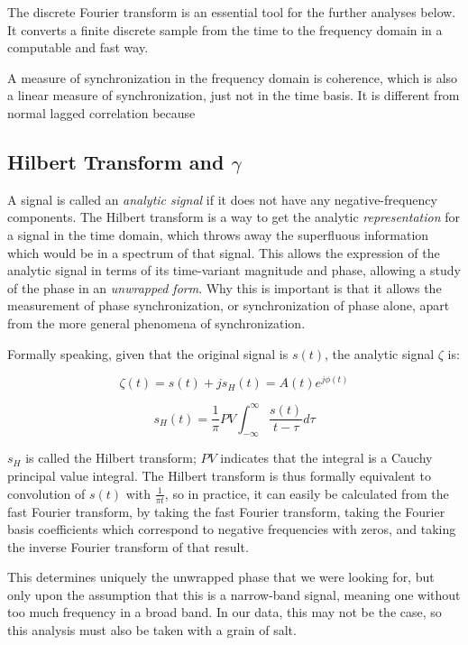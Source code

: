 \documentclass[12pt]{article}
\begin{document}
The discrete Fourier transform is an essential tool for the further analyses below. It converts a finite discrete sample from the time to the frequency domain in a computable and fast way.

A measure of synchronization in the frequency domain is coherence, which is also a linear measure of synchronization, just not in the time basis. It is different from normal lagged correlation because %


\subsection{Hilbert Transform and $\gamma$}

A signal is called an \emph{analytic signal} if it does not have any negative-frequency components. The Hilbert transform is a way to get the analytic \emph{representation} for a signal in the time domain, which throws away the superfluous information which would be in a spectrum of that signal. This allows the expression of the analytic signal in terms of its time-variant magnitude and phase, allowing a study of the phase in an \emph{unwrapped form}\cite{gabor}. Why this is important is that it allows the measurement of phase synchronization, or synchronization of phase alone, apart from the more general phenomena of synchronization.

Formally speaking, given that the original signal is $s(t)$, the analytic signal $\zeta$ is:

$$\zeta(t) = s(t) + js_H(t) = A(t)e^{j\phi(t)}$$

$$s_H(t) = \frac{1}{\pi} PV \int_{-\infty}^{\infty} \frac{s(t)}{t - \tau} d\tau$$

$s_H$ is called the Hilbert transform; $PV$ indicates that the integral is a Cauchy principal value integral. The Hilbert transform is thus formally equivalent to convolution of $s(t)$ with $\frac{1}{\pi t}$, so in practice, it can easily be calculated from the fast Fourier transform, by taking the fast Fourier transform, taking the Fourier basis coefficients which correspond to negative frequencies with zeros, and taking the inverse Fourier transform of that result.\cite{hilbert}

This determines uniquely the unwrapped phase that we were looking for, but only upon the assumption that this is a narrow-band signal, meaning one without too much frequency in a broad band. In our data, this may not be the case, so this analysis must also be taken with a grain of salt. %
\end{document}
